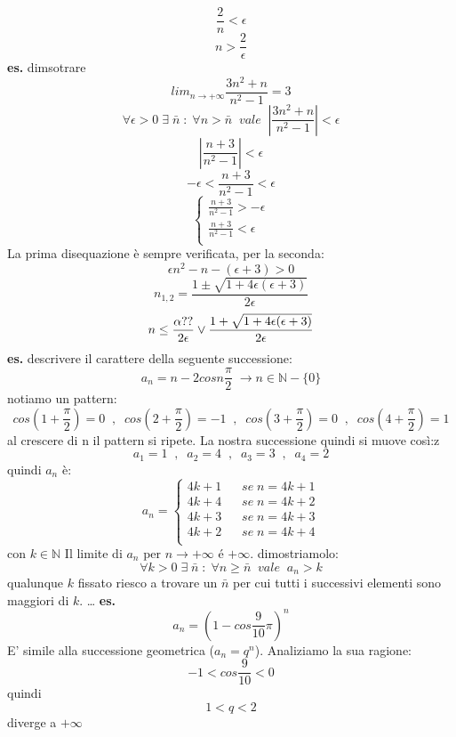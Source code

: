 \[
    \frac{2}{n}< \epsilon
\]
\[
    n> \frac{2}{\epsilon}
\]
\newline
\newline
\textbf{es.} dimsotrare
\[
    lim_{n\rightarrow+\infty} \frac{3n^2 +n}{n^2-1} = 3
\]
\[
    \forall \epsilon > 0 \;\exists\; \bar{n} \;:\; \forall n > \bar{n} \;\;vale\;\; |\frac{3n^2 +n}{n^2-1}| <\epsilon 
\]
\[
    |\frac{n+3}{n^2-1}|<\epsilon
\]
\[
    -\epsilon< \frac{n+3}{n^2-1}< \epsilon
\]
\[
    \begin{cases}
        \frac{n+3}{n^2-1}>-\epsilon \\
        \frac{n+3}{n^2-1}< \epsilon \\
    \end{cases}
\]
La prima disequazione è sempre verificata, per la seconda:
\[
    \epsilon n^2 - n -(\epsilon + 3) > 0
\]
\[
    n_{1,2} = \frac{1 \pm \sqrt{1+4\epsilon(\epsilon+3)}}{2\epsilon}
\]
\[
    n \leq \frac{\-\alpha ??}{2\epsilon} \lor \frac{1+\sqrt{1+4\epsilon(\epsilon+3)}}{2\epsilon}
\]
\newline
\newline
\textbf{es.} descrivere il carattere della seguente successione:
\[
    a_n = n-2 cos n \frac{\pi}{2} \;\rightarrow n\in \mathbb{N}- \{0\}
\]
notiamo un pattern:
\[
    cos(1+ \frac{\pi}{2}) = 0 \;\;,\;\;
    cos(2+ \frac{\pi}{2}) = -1 \;\;,\;\;
    cos(3+ \frac{\pi}{2}) = 0 \;\;,\;\;
    cos(4+ \frac{\pi}{2}) = 1
\]
al crescere di n il pattern si ripete. La nostra successione quindi si muove così:z
\[
    a_1 = 1 \;\;,\;\;
    a_2 = 4 \;\;,\;\;
    a_3 = 3 \;\;,\;\;
    a_4 = 2
\]
quindi $a_n$ è:
\[
    a_n = 
    \begin{cases}
        4k+1 \;\;\;&se \;n= 4k+1 \\
        4k+4 \;\;\;&se \;n = 4k+2\\
        4k+3 \;\;\;&se \;n= 4k+3\\
        4k+2 \;\;\;&se \;n= 4k+4\\
    \end{cases}
\]
con $k \in \mathbb{N}$
\newline
Il limite di $a_n$ per $n\rightarrow +\infty$ é $+\infty$.
\newline
dimostriamolo:
\[
    \forall k>0 \;\exists\; \bar{n} \;:\; \forall n \geq \bar{n} \;\;vale\;\; a_n> k
\]
qualunque $k$ fissato riesco a trovare un $\bar{n}$ per cui tutti i successivi elementi sono maggiori di $k$.
 \dots
\newline
\newline
\newline
\textbf{es.} 
\[
    a_n = (1-cos \frac{9}{10}\pi )^n
\]
E' simile alla successione geometrica ($a_n = q^n$).
\newline
Analiziamo la sua ragione:
\[
    -1 < cos \frac{9}{10} < 0
\]
quindi
\[
    1<q<2  
\]
diverge a $+\infty$